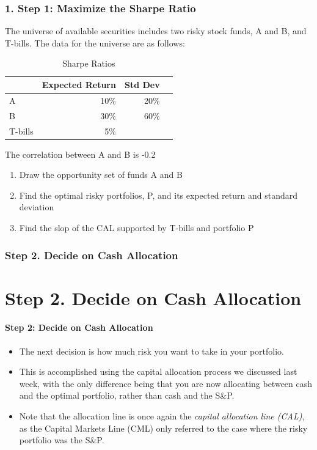 \documentclass{beamer}
\begin{document}
\begin{practiceframe}
    \frametitle{1. Step 1: Maximize the Sharpe Ratio}

    \footnotesize
    The universe of available securities includes two risky stock funds, A  and B, and T-bills.   The data for the universe are as follows:

    \begin{table}
        \caption{Sharpe Ratios}
        \begin{tabular}{lrrr}
            \toprule
            & Expected Return & Std Dev\\
            \midrule
            A & 10\% & 20\%\\
            B & 30\% & 60\%\\
            T-bills & 5\% & \\
            \bottomrule
        \end{tabular}
    \end{table}
    The correlation between A and B is -0.2

    \begin{enumerate}
        \item Draw the opportunity set of funds A and B
        \item Find the optimal risky portfolios, P, and its expected return and standard deviation
        \item Find the slop of the CAL supported by T-bills and portfolio P
    \end{enumerate}



\end{practiceframe}

\begin{frame}[t]
    \frametitle{Step 2. Decide on Cash Allocation}
    \section{Step 2. Decide on Cash Allocation}
    \framesubtitle{Step 2: Decide on Cash Allocation}

    \begin{itemize}
    \item The next decision is how much risk you want to take in your 
    portfolio.  
    \item This is accomplished using the capital allocation 
    process we discussed last week, with the only difference being that 
    you are now allocating between cash and the optimal portfolio, 
    rather than cash and the S\&P.
    \item Note that the allocation line is once again the \textit{capital allocation line (CAL)}, 
    as the Capital Markets Line (CML) only referred to the case where the risky portfolio was the S\&P.
    \end{itemize}

\end{frame}
\end{document}
